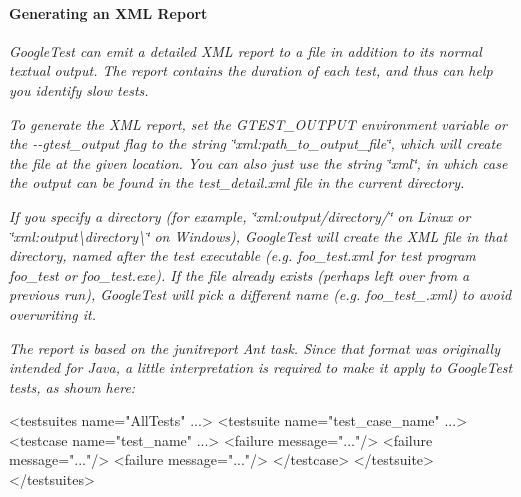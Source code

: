 {\itshape \paragraph*{Generating an X\+ML Report}}

{\itshape }

{\itshape Google\+Test can emit a detailed X\+ML report to a file in addition to its normal textual output. The report contains the duration of each test, and thus can help you identify slow tests.}

{\itshape To generate the X\+ML report, set the {\ttfamily G\+T\+E\+S\+T\+\_\+\+O\+U\+T\+P\+UT} environment variable or the {\ttfamily -\/-\/gtest\+\_\+output} flag to the string {\ttfamily \char`\"{}xml\+:path\+\_\+to\+\_\+output\+\_\+file\char`\"{}}, which will create the file at the given location. You can also just use the string {\ttfamily \char`\"{}xml\char`\"{}}, in which case the output can be found in the {\ttfamily test\+\_\+detail.\+xml} file in the current directory.}

{\itshape If you specify a directory (for example, {\ttfamily \char`\"{}xml\+:output/directory/\char`\"{}} on Linux or {\ttfamily \char`\"{}xml\+:output\textbackslash{}directory\textbackslash{}\char`\"{}} on Windows), Google\+Test will create the X\+ML file in that directory, named after the test executable (e.\+g. {\ttfamily foo\+\_\+test.\+xml} for test program {\ttfamily foo\+\_\+test} or {\ttfamily foo\+\_\+test.\+exe}). If the file already exists (perhaps left over from a previous run), Google\+Test will pick a different name (e.\+g. {\ttfamily foo\+\_\+test\+\_.\+xml}) to avoid overwriting it.}

{\itshape The report is based on the {\ttfamily junitreport} Ant task. Since that format was originally intended for Java, a little interpretation is required to make it apply to Google\+Test tests, as shown here\+:}

{\itshape 
\begin{DoxyCode}
<\textcolor{keywordtype}{testsuites} \textcolor{keyword}{name}=\textcolor{stringliteral}{"AllTests"} ...>
  <\textcolor{keywordtype}{testsuite} \textcolor{keyword}{name}=\textcolor{stringliteral}{"test\_case\_name"} ...>
    <\textcolor{keywordtype}{testcase}    \textcolor{keyword}{name}=\textcolor{stringliteral}{"test\_name"} ...>
      <\textcolor{keywordtype}{failure} \textcolor{keyword}{message}=\textcolor{stringliteral}{"..."}/>
      <\textcolor{keywordtype}{failure} \textcolor{keyword}{message}=\textcolor{stringliteral}{"..."}/>
      <\textcolor{keywordtype}{failure} \textcolor{keyword}{message}=\textcolor{stringliteral}{"..."}/>
    </\textcolor{keywordtype}{testcase}>
  </\textcolor{keywordtype}{testsuite}>
</\textcolor{keywordtype}{testsuites}>
\end{DoxyCode}
}

